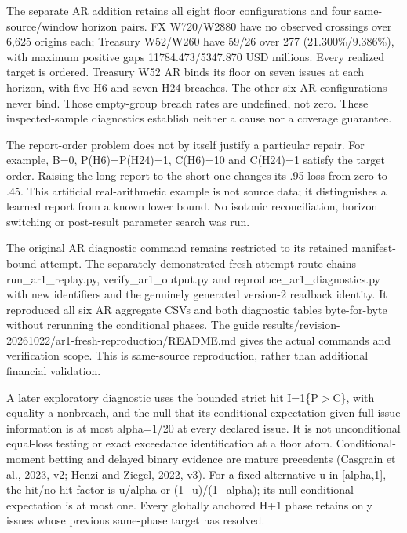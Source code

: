 \documentclass[10pt,a4paper]{article}
\begin{document}
The separate AR addition retains all eight floor configurations and four same-source/window horizon pairs. FX W720/W2880 have no observed crossings over 6,625 origins each; Treasury W52/W260 have 59/26 over 277 (21.300\%/9.386\%), with maximum positive gaps 11784.473/5347.870 USD millions. Every realized target is ordered. Treasury W52 AR binds its floor on seven issues at each horizon, with five H6 and seven H24 breaches. The other six AR configurations never bind. Those empty-group breach rates are undefined, not zero. These inspected-sample diagnostics establish neither a cause nor a coverage guarantee.

The report-order problem does not by itself justify a particular repair. For example, B=0, P(H6)=P(H24)=1, C(H6)=10 and C(H24)=1 satisfy the target order. Raising the long report to the short one changes its .95 loss from zero to .45. This artificial real-arithmetic example is not source data; it distinguishes a learned report from a known lower bound. No isotonic reconciliation, horizon switching or post-result parameter search was run.

The original AR diagnostic command remains restricted to its retained manifest-bound attempt. The separately demonstrated fresh-attempt route chains run\_ar1\_replay.py, verify\_ar1\_output.py and reproduce\_ar1\_diagnostics.py with new identifiers and the genuinely generated version-2 readback identity. It reproduced all six AR aggregate CSVs and both diagnostic tables byte-for-byte without rerunning the conditional phases. The guide results/revision-20261022/ar1-fresh-reproduction/README.md gives the actual commands and verification scope. This is same-source reproduction, rather than additional financial validation.

A later exploratory diagnostic uses the bounded strict hit I=1\{P\( > \)C\}, with equality a nonbreach, and the null that its conditional expectation given full issue information is at most alpha=1/20 at every declared issue. It is not unconditional equal-loss testing or exact exceedance identification at a floor atom. Conditional-moment betting and delayed binary evidence are mature precedents (Casgrain et al., 2023, v2; Henzi and Ziegel, 2022, v3). For a fixed alternative u in [alpha,1], the hit/no-hit factor is u/alpha or (1\(-\)u)/(1\(-\)alpha); its null conditional expectation is at most one. Every globally anchored H+1 phase retains only issues whose previous same-phase target has resolved.
\end{document}
